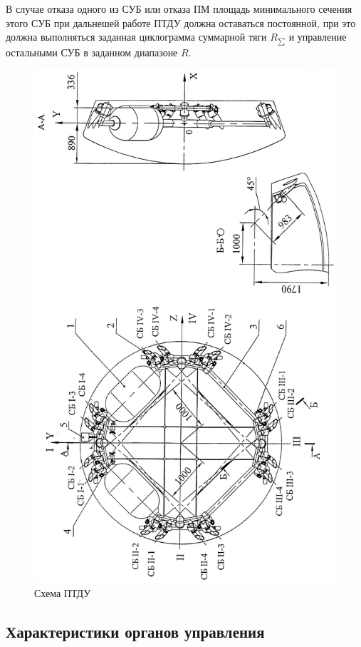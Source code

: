 В случае отказа одного из СУБ или отказа ПМ площадь минимального сечения этого СУБ при дальнешей работе ПТДУ должна оставаться постоянной, при это должна выполняться заданная циклограмма суммарной тяги $R_{\sum}$  и управление остальными СУБ в заданном диапазоне $R$.
\begin{figure}[h]
	\centering
	\includegraphics[scale=0.3]{images/scheme_ptdu.jpg}
	\caption{Схема ПТДУ}
	\label{fig:scheme_ptdu}
\end{figure}
\clearpage

\subsection{Характеристики органов управления}

